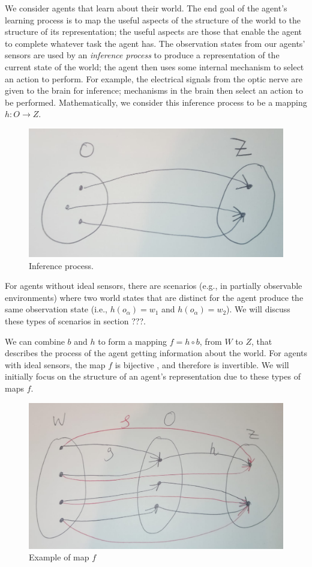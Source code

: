 We consider agents that learn about their world.
The end goal of the agent’s learning process is to map the useful aspects of the structure of the world to the structure of its representation; the useful aspects are those that enable the agent to complete whatever task the agent has.
The observation states from our agents' sensors are used by an \emph{inference process} to produce a representation of the current state of the world; the agent
then uses some internal mechanism to select an action to perform.
For example, the electrical signals from the optic nerve are given to the brain for inference; mechanisms in the brain then select an action to be performed.
Mathematically, we consider this inference process to be a mapping $h: O \to Z$.
\begin{figure}
    \centering
    \includegraphics[width=0.5\linewidth]{2MathematicalFramework/InitialFramework/Images/inference_process_O_to_Z.jpeg}
    \caption{
        Inference process.
    }
    \label{fig:inference_process_O_to_Z}
\end{figure}

For agents without ideal sensors, there are scenarios (e.g., in partially observable environments) where two world states that are distinct for the agent produce the same observation state (i.e., $h(o_{\alpha}) = w_{1}$ and $h(o_{\alpha}) = w_{2}$).
We will discuss these types of scenarios in section ???.

We can combine $b$ and $h$ to form a mapping $f = h \circ b$, from $W$ to $Z$, that describes the process of the agent getting information about the world.
For agents with ideal sensors, the map $f$ is bijective
, and therefore is invertible.
We will initially focus on the structure of an agent's representation due to these types of maps $f$.
\begin{figure}
    \centering
    \includegraphics[width=0.5\linewidth]{2MathematicalFramework/InitialFramework/Images/W_to_Z.jpeg}
    \caption{
        Example of map $f$
    }
    \label{fig:W_to_Z}
\end{figure}


